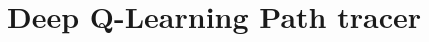 \documentclass[ %
                    author={Callum Pearce},
                supervisor={Dr. Neill Campbell},
                    degree={MEng},
                     title={How effective are Temporal difference learning methods for reducing the number of zero contribution light paths while still accurately approximating Global Illumination in Path tracing?},
                  subtitle={},
                      type={research},
                      year={2019} ]{dissertation}
\begin{document}

\chapter{Deep Q-Learning Path tracer}
\label{chap:deep-q}

\end{document}
